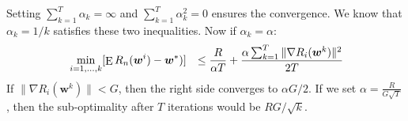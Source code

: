 \documentclass[11pt, a4paper, reqno, twoside]{scrartcl}
\theoremstyle{style}
\DeclareMathOperator*{\E}{\rm E}
\newcommand{\wv}{\bm{w}}
\newcommand{\0}{\mathbf{0}} %
\begin{document}
Setting $\sum_{k=1}^T \alpha_k = \infty$ and $\sum_{k=1}^T \alpha_k^2 = 0$
ensures the convergence. We know that $\alpha_k = 1/k$ satisfies these two inequalities.
Now if $\alpha_k = \alpha$:
\begin{eqnarray*}
	& \min_{i=1,\ldots,k} [\E R_n(\wv^i)-\wv^*)]  & \leq \frac{R}{\alpha T} +
	\frac{\alpha \sum_{k=1}^T \| \nabla R_i(\wv^k) \|^2 }{ 2T}
\end{eqnarray*}
If $\| \nabla R_i(\wv^k)\| < G$, then the right side converges to $\alpha G/2$. 
If we set $\alpha = \frac{R}{G \sqrt{T}}$, then the sub-optimality after $T$
iterations would be $RG/\sqrt{k}$.  
 


\end{document}
